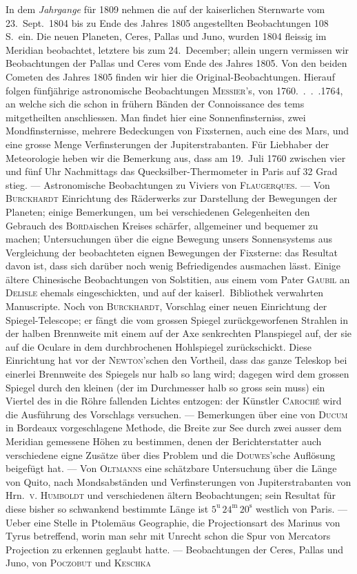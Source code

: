 In dem \emph{Jahrgange} für 1809 nehmen die auf der kaiserlichen Sternwarte vom 23.\ Sept.\ 1804 bis zu Ende des Jahres 1805 angestellten Beobachtungen 108 S.\ ein. Die neuen Planeten, Ceres, Pallas und Juno, wurden 1804 fleissig im Meridian beobachtet, letztere bis zum 24.\ December; allein ungern vermissen wir Beobachtungen der Pallas und Ceres vom Ende des Jahres 1805. Von den beiden Cometen des Jahres 1805 finden wir hier die Original-Beobachtungen. Hierauf folgen fünfjährige astronomische Beobachtungen \textsc{Messier}'s, von 1760\mbox{. . . .}1764, an welche sich die schon in frühern Bänden der Connoissance des tems mitgetheilten anschliessen.  Man findet hier eine Sonnenfinsterniss, zwei Mondfinsternisse, mehrere Bedeckungen von Fixsternen, auch eine des Mars, und eine grosse Menge Verfinsterungen der Jupiterstrabanten. Für Liebhaber der Meteorologie heben wir die Bemerkung aus, dass am 19.\ Juli 1760 zwischen vier und fünf Uhr Nachmittags das Quecksilber-Thermometer in Paris auf 32 Grad stieg. --- Astronomische Beobachtungen zu Viviers von \textsc{Flaugerques}. --- Von \textsc{Burckhardt} Einrichtung des Räderwerks zur Darstellung der Bewegungen der Planeten; einige Bemerkungen, um bei verschiedenen Gelegenheiten den Gebrauch des \textsc{Borda}ischen Kreises schärfer, allgemeiner und bequemer zu machen; Untersuchungen über die eigne Bewegung unsers Sonnensystems aus Vergleichung der beobachteten eignen Bewegungen der Fixsterne: das Resultat davon ist, dass sich darüber noch wenig Befriedigendes ausmachen lässt. Einige ältere Chinesische Beobachtungen von Solstitien, aus einem vom Pater \textsc{Gaubil} an \textsc{Delisle} ehemals eingeschickten, und auf der kaiserl.\ Bibliothek verwahrten Manuscripte. Noch von \textsc{Burckhardt}, Vorschlag einer neuen Einrichtung der Spiegel-Telescope; er fängt die vom grossen Spiegel zurückgeworfenen Strahlen in der halben Brennweite mit einem auf der Axe senkrechten Planspiegel auf, der sie auf die Oculare in dem durchbrochenen Hohlspiegel zurückschickt. Diese Einrichtung hat vor der \textsc{Newton}'schen den Vortheil, dass das ganze Teleskop bei einerlei Brennweite des Spiegels nur halb so lang wird; dagegen wird dem grossen Spiegel durch den kleinen (der im Durchmesser halb so gross sein muss) ein Viertel des in die Röhre fallenden Lichtes entzogen: der Künstler \textsc{Caroché} wird die Ausführung des Vorschlags versuchen. --- Bemerkungen über eine von \textsc{Ducum} in Bordeaux vorgeschlagene Methode, die Breite zur See durch zwei ausser dem Meridian gemessene Höhen zu bestimmen, denen der Berichterstatter auch verschiedene eigne Zusätze über dies Problem und die \textsc{Douwes}'sche Auflösung beigefügt hat. --- Von \textsc{Oltmanns} eine schätzbare Untersuchung über die Länge von Quito, nach Mondsabständen und Verfinsterungen von Jupiterstrabanten von Hrn.\ \textsc{v. Humboldt} und verschiedenen ältern Beobachtungen; sein Resultat für diese bisher so schwankend bestimmte Länge ist $5^{\mathrm u}\,24^{\mathrm m}\,20^{\mathrm s}$ westlich von Paris. --- Ueber eine Stelle in Ptolemäus Geographie, die Projectionsart des Marinus von Tyrus betreffend, worin man sehr mit Unrecht schon die Spur von Mercators Projection zu erkennen geglaubt hatte. --- Beobachtungen der Ceres, Pallas und Juno, von \textsc{Poczobut} und \textsc{Keschka} 